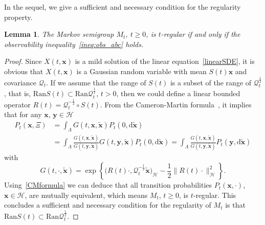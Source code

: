 \documentclass[10pt]{elsarticle}
\newtheorem{lemma}{Lemma}
\begin{document}
In the sequel, we give a sufficient and necessary condition for the regularity property.

\begin{lemma}\label{regularity}
The Markov semigroup $M_{t}$, $t\geqslant0$, is $t$-regular if and only if the observability inequality~\eqref{ineq:obs_abc} holds.
\end{lemma}
\begin{proof}
Since $X(t, \mathbf{x})$ is a mild solution of the linear equation~\eqref{linearSDE}, it is obvious that $X(t, \mathbf{x})$ is a Gaussian random variable with mean $S(t)\mathbf{x}$ and covariance $\mathcal{Q}_{t}$. If we assume that the range of $S(t)$ is a subset of the range of $\mathcal{Q}_{t}^{\frac{1}{2}}$, that is,  
$\textrm{Ran} S(t)\subset \textrm{Ran}\mathcal{Q}_{t}^{\frac{1}{2}}$, $t>0$,
then we could define a linear bounded operator $R(t)=\mathcal{Q}_{t}^{-\frac{1}{2}}\circ S(t)$.  From the Cameron-Martin formula~\cite[Proposition 2.24, pp. 68]{da2014stochastic}, it implies that for any $\mathbf{x}$, $\mathbf{y}\in \mathcal{H}$
 \begin{equation}\label{CMformula}
 \begin{aligned}
	P_t(\mathbf{x}, \Xi) &= \int_{\Lambda}G(t,\mathbf{x}, \tilde{\mathbf{x}})P_t(0, \mathrm{d}\tilde{\mathbf{x}})\\
	&= \int_{\Lambda}\frac{G(t,\mathbf{x}, \tilde{\mathbf{x}})}{G(t,\mathbf{y}, \tilde{\mathbf{x}})}G(t,\mathbf{y}, \tilde{\mathbf{x}})P_t(0, \mathrm{d}\tilde{\mathbf{x}}) = \int_{\Lambda}\frac{G(t,\mathbf{x}, \tilde{\mathbf{x}})}{G(t,\mathbf{y}, \tilde{\mathbf{x}})}P_t(\mathbf{y}, \mathrm{d}\tilde{\mathbf{x}})
 \end{aligned}
\end{equation} 
with
\[
G(t, \cdot, \tilde{\mathbf{x}})=\exp\left\{\big(R(t)\cdot, \mathcal{Q}_{t}^{-\frac{1}{2}}\tilde{\mathbf{x}}\big)_{\mathcal{H}}-\frac{1}{2}\|R(t)\cdot\|_{\mathcal{H}}^2\right\}.
\]	
Using~\eqref{CMformula} we can deduce that all transition probabilities $P_{t}(\mathbf{x}, \cdot)$, $\mathbf{x}\in\mathcal{H}$, are mutually equivalent, which means $M_{t}$, $t\geqslant0$, is $t$-regular.
This concludes a sufficient and necessary condition for the regularity of $M_{t}$ is that $\textrm{Ran} S(t)\subset \textrm{Ran}\mathcal{Q}_{t}^{\frac{1}{2}}$.


\end{proof}
\end{document}
